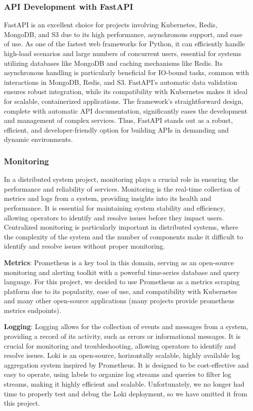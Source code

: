 \documentclass{article}
\begin{document}
    \subsubsection{API Development with FastAPI}
    FastAPI is an excellent choice for projects involving Kubernetes, Redis, MongoDB, and S3 due to its high performance, asynchronous support, and ease of use. As one of the fastest web frameworks for Python, it can efficiently handle high-load scenarios and large numbers of concurrent users, essential for systems utilizing databases like MongoDB and caching mechanisms like Redis. Its asynchronous handling is particularly beneficial for IO-bound tasks, common with interactions in MongoDB, Redis, and S3. FastAPI's automatic data validation ensures robust integration, while its compatibility with Kubernetes makes it ideal for scalable, containerized applications. The framework's straightforward design, complete with automatic API documentation, significantly eases the development and management of complex services. Thus, FastAPI stands out as a robust, efficient, and developer-friendly option for building APIs in demanding and dynamic environments.

    \subsubsection{Monitoring}
    In a distributed system project, monitoring plays a crucial role in ensuring the performance and reliability of services. Monitoring is the real-time collection of metrics and logs from a system, providing insights into its health and performance. It is essential for maintaining system stability and efficiency, allowing operators to identify and resolve issues before they impact users. Centralized monitoring is particularly important in distributed systems, where the complexity of the system and the number of components make it difficult to identify and resolve issues without proper monitoring.

    \textbf{Metrics}:
    Prometheus is a key tool in this domain, serving as an open-source monitoring and alerting toolkit with a powerful time-series database and query language. For this project, we decided to use Prometheus as a metrics scraping platform due to its popularity, ease of use, and compatibility with Kubernetes and many other open-source applications (many projects provide prometheus metrics endpoints).

    \textbf{Logging}:
    Logging allows for the collection of events and messages from a system, providing a record of its activity, such as errors or informational messages. It is crucial for monitoring and troubleshooting, allowing operators to identify and resolve issues. Loki is an open-source, horizontally scalable, highly available log aggregation system inspired by Prometheus. It is designed to be cost-effective and easy to operate, using labels to organize log streams and queries to filter log streams, making it highly efficient and scalable. Unfortunately, we no longer had time to properly test and debug the Loki deployment, so we have omitted it from this project.
\end{document}
